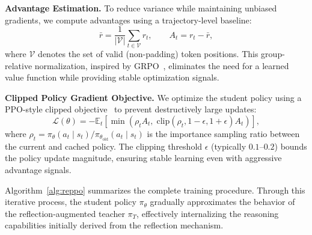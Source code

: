\documentclass{article}
\theoremstyle{plain}
\theoremstyle{definition}
\theoremstyle{remark}
\begin{document}
\textbf{Advantage Estimation.}
To reduce variance while maintaining unbiased gradients, we compute advantages using a trajectory-level baseline:
\begin{equation}
\bar{r} = \frac{1}{|\mathcal{V}|}\sum_{t\in\mathcal{V}} r_t, \qquad A_t = r_t - \bar{r},
\label{eq:advantage}
\end{equation}
where $\mathcal{V}$ denotes the set of valid (non-padding) token positions.
This group-relative normalization, inspired by GRPO~\cite{deepseekmath}, eliminates the need for a learned value function while providing stable optimization signals.

\textbf{Clipped Policy Gradient Objective.}
We optimize the student policy using a PPO-style clipped objective~\cite{proximalpolicyoptimizationalgorithms} to prevent destructively large updates:
\begin{equation}
\mathcal{L}(\theta) = -\mathbb{E}_{t}\left[\min\left(\rho_t A_t,\;\mathrm{clip}(\rho_t, 1-\epsilon, 1+\epsilon)A_t\right)\right],
\label{eq:ppo_loss}
\end{equation}
where $\rho_t = \pi_\theta(a_t\mid s_t)/\pi_{\theta_{\text{old}}}(a_t\mid s_t)$ is the importance sampling ratio between the current and cached policy.
The clipping threshold $\epsilon$ (typically $0.1$–$0.2$) bounds the policy update magnitude, ensuring stable learning even with aggressive advantage signals.

Algorithm~\ref{alg:reppo} summarizes the complete training procedure. Through this iterative process, the student policy 
$\pi_\theta$ gradually approximates the behavior of the reflection-augmented teacher $\pi_T$, effectively 
internalizing the reasoning capabilities initially derived from the reflection mechanism. 
\end{document}
